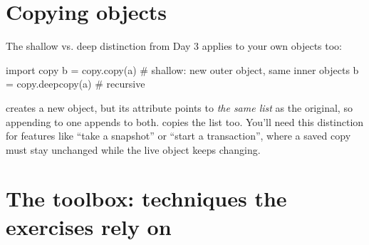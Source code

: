 \documentclass[10pt,a4paper]{article}
\begin{document}
\section{Copying objects}
The shallow vs. deep distinction from Day 3 applies to your own objects too:
\begin{pycode}
import copy
b = copy.copy(a)        # shallow: new outer object, same inner objects
b = copy.deepcopy(a)    # recursive
\end{pycode}
 creates a new  object, but its  attribute points to \emph{the same list} as the original, so appending to one appends to both.  copies the list too. You’ll need this distinction for features like “take a snapshot” or “start a transaction”, where a saved copy must stay unchanged while the live object keeps changing.
\setcounter{section}{9}
\section{The toolbox: techniques the exercises rely on}
\end{document}
